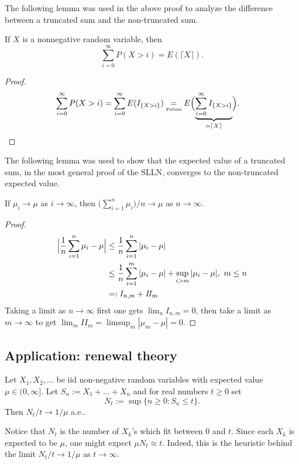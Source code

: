 The following lemma was used in the above proof to analyze the difference between a truncated sum and the non-truncated sum.

\begin{lemma}
\label{lemma: expect ceiling}
If $X$ is a nonnegative random variable, then
\begin{equation}
\label{rtyu}
 \sum_{i=0}^\infty P(X>i) = E( \lceil X\rceil).
 \end{equation}
\end{lemma}
\begin{proof}
\begin{align*}
\sum_{i=0}^\infty P(X>i)
& = \sum_{i=0}^\infty E(I_{\{X>i\}})  \underset{\text{\tiny Fubini}} =  E\Bigl(\underbrace{\sum_{i=0}^\infty I_{\{X>i\}}}_{=\lceil X\rceil}\Bigr).
\end{align*}
\end{proof}



The following lemma was used to show that the expected value of a truncated sum, in the most general proof of the SLLN, converges to the non-truncated expected value.
\begin{lemma}
\label{lemma: cesar summation}
If $\mu_i\rightarrow \mu$ as $i\rightarrow \infty$, then $\bigl(\sum_{i=1}^n \mu_i\bigr)/n\rightarrow \mu$ as $n\rightarrow \infty$.
\end{lemma}
\begin{proof}
\begin{align*}
\Bigl|\frac{1}{n}\sum_{i=1}^n \mu_i-  \mu\Bigr|
& \leq \frac{1}{n}\sum_{i=1}^n |\mu_i - \mu|\\
& \leq \frac{1}{n}\sum_{i=1}^m |\mu_i - \mu| + \sup_{i > m} |\mu_i - \mu|,\,\, m\leq n\\
& =: I_{n,m} + I\!I_{m}
\end{align*}
Taking a limit as $n\rightarrow \infty$ first one gets $\lim_{n} I_{n,m} = 0$, then take a limit as $m\rightarrow \infty$ to get $\lim_{m} I\!I_{m} = \limsup_{m} |\mu_m - \mu| = 0$.
\end{proof}

\subsection{Application: renewal theory}

\begin{theorem}
Let $X_1, X_2, \ldots$ be iid non-negative random variables with expected value $\mu\in(0,\infty]$. Let $S_n:= X_1+\ldots+X_n$ and for real numbers $t\geq 0$ set
\[N_t:=\sup\{ n\geq 0\colon S_n\leq t \}.  \]
Then $N_t/t \rightarrow 1/\mu$ a.e..
\end{theorem}
Notice that $N_t$ is the number of $X_k$'s which fit between $0$ and $t$. Since each $X_k$ is expected to be $\mu$, one might expect $\mu N_t\approx t$. Indeed, this is the heuristic behind the limit $N_t/t \rightarrow 1/\mu$ as $t\rightarrow \infty$.

